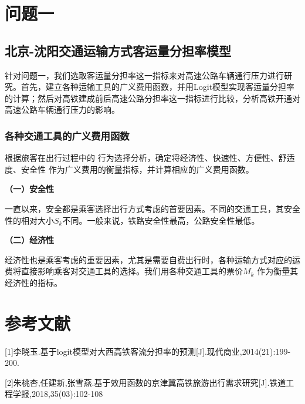 \documentclass[12pt]{article}
\begin{document}
\newpage

\section{问题一}

\subsection{北京-沈阳交通运输方式客运量分担率模型}

针对问题一，我们选取客运量分担率这一指标来对高速公路车辆通行压力进行研究。首先，建立各种运输工具的广义费用函数，并用Logit模型实现客运量分担率的计算；然后对高铁建成前后高速公路分担率这一指标进行比较，分析高铁开通对高速公路车辆通行压力的影响。

\subsubsection{各种交通工具的广义费用函数}

根据旅客在出行过程中的
行为选择分析，确定将经济性、快速性、方便性、舒适度、安全性
作为广义费用的衡量指标，并计算相应的广义费用函数。

\textbf{（一）安全性}

一直以来，安全都是乘客选择出行方式考虑的首要因素。不同的交通工具，其安全性的相对大小$S_{k}$不同。一般来说，铁路安全性最高，公路安全性最低。

\textbf{（二）经济性}

经济性也是乘客考虑的重要因素，尤其是需要自费出行时，各种运输方式对应的运费将直接影响乘客对交通工具的选择。我们用各种交通工具的票价$M_{k}$ 作为衡量其经济性的指标。

\section*{参考文献}

[1]李晓玉.基于logit模型对大西高铁客流分担率的预测[J].现代商业,2014(21):199-200.

[2]朱桃杏,任建新,张雪燕.基于效用函数的京津冀高铁旅游出行需求研究[J].铁道工程学报,2018,35(03):102-108
\end{document}
